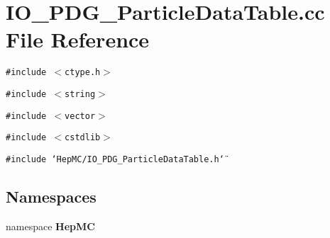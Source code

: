 \section{IO\_\-PDG\_\-Particle\-Data\-Table.cc File Reference}
\label{IO__PDG__ParticleDataTable_8cc}
{\tt \#include $<$ctype.h$>$}\par
{\tt \#include $<$string$>$}\par
{\tt \#include $<$vector$>$}\par
{\tt \#include $<$cstdlib$>$}\par
{\tt \#include \char`\"{}Hep\-MC/IO\_\-PDG\_\-Particle\-Data\-Table.h\char`\"{}}\par
\subsection*{Namespaces}
\begin{CompactItemize}
\item 
namespace {\bf Hep\-MC}
\end{CompactItemize}
